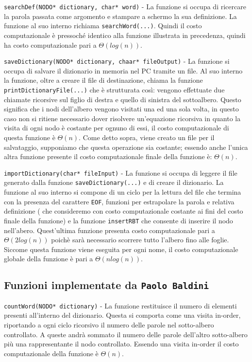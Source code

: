 \documentclass[paper=a4, fontsize=11pt,twoside]{scrartcl}   %
\begin{document}
				\texttt{searchDef(NODO* dictionary, char* word)} - La funzione si occupa di ricercare la parola passata come argomento e stampare a schermo la sua definizione. La funzione al suo interno richiama \texttt{searchWord(...)}. Quindi il costo computazionale è pressoché identico alla funzione illustrata in precedenza, quindi ha costo computazionale pari a $\Theta(log(n))$.\par
				
				\texttt{saveDictionary(NODO* dictionary, chaar* fileOutput)} - La funzione si occupa di salvare il dizionario in memoria nel PC tramite un file. Al suo interno la funzione, oltre a creare il file di destinazione, chiama la funzione \texttt{printDictionaryFile(...)} che è strutturata così: vengono effettuate due chiamate ricorsive sul figlio di destra e quello di sinistra del sottoalbero. Questo significa che i nodi dell'albero vengono visitati una ed una sola volta, in questo caso non si ritiene necessario dover risolvere un'equazione ricorsiva in quanto la visita di ogni nodo è costante per ognuno di essi, il costo computazionale di questa funzione è $\Theta(n)$. Come detto sopra, viene creato un file per il salvataggio, supponiamo che questa operazione sia costante; essendo anche l'unica altra funzione presente il costo computazionale finale della funzione è: $\Theta(n)$.\par
				
				\texttt{importDictionary(char* fileInput)} - La funzione si occupa di leggere il file generato dalla funzione \texttt{saveDictionary(...)} e di creare il dizionario. La funzione al suo interno si compone di un ciclo per la lettura del file che termina con la presenza del carattere \texttt{EOF}, funzioni per estrapolare la parola e relativa definizione ( che consideremo con costo computazionale costante ai fini del costo finale della funzione) e la funzione \texttt{insertRBT} che consente di inserire il nodo nell'abero. Quest'ultima funzione presenta costo computazionale pari a $\Theta(2log(n))$ poichè sarà necessario scorrere tutto l'albero fino alle foglie. Siccome questa funzione viene eseguita per ogni nome, il costo computazionale globale della funzione è pari a $\Theta(nlog(n))$.\par 
				
			\subsection{Funzioni implementate da \texttt{Paolo Baldini}}
				\texttt{countWord(NODO* dictionary)} - La funzione restituisce il numero di elementi presenti all’interno del dizionario. Questa si comporta come una visita in-order, riportando a ogni ciclo ricorsivo il numero delle parole nel sotto-albero controllato. A queste andrà sommato il numero delle parole dell’altro sotto-albero più una rappresentante il nodo controllato. Essendo una visita in-order il costo computazionale della funzione è $\Theta(n)$.\par
				
\end{document}

